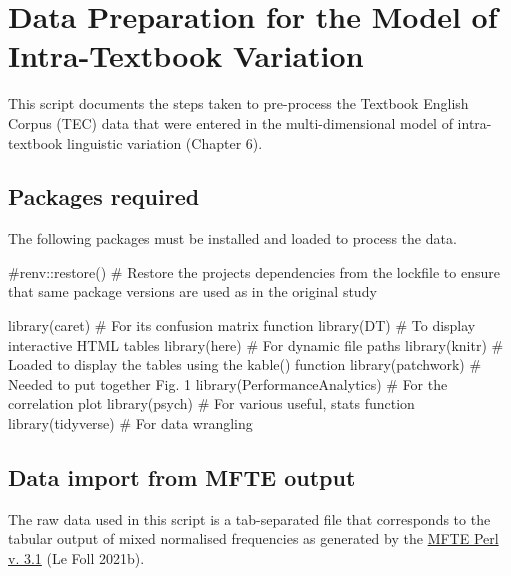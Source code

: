 \documentclass[
  letterpaper,
  DIV=11,
  numbers=noendperiod]{scrreprt}
\newenvironment{Shaded}{\begin{snugshade}}{\end{snugshade}}
\newcommand{\CommentTok}[1]{\textcolor[rgb]{0.37,0.37,0.37}{#1}}
\newcommand{\FunctionTok}[1]{\textcolor[rgb]{0.28,0.35,0.67}{#1}}
\newcommand{\NormalTok}[1]{\textcolor[rgb]{0.00,0.23,0.31}{#1}}
\begin{document}
\chapter{Data Preparation for the Model of Intra-Textbook
Variation}\label{data-preparation-for-the-model-of-intra-textbook-variation}

This script documents the steps taken to pre-process the Textbook
English Corpus (TEC) data that were entered in the multi-dimensional
model of intra-textbook linguistic variation (Chapter 6).

\section{Packages required}\label{packages-required}

The following packages must be installed and loaded to process the data.

\begin{Shaded}
\begin{Highlighting}[]
\CommentTok{\#renv::restore() \# Restore the project\textquotesingle{}s dependencies from the lockfile to ensure that same package versions are used as in the original study}

\FunctionTok{library}\NormalTok{(caret) }\CommentTok{\# For its confusion matrix function}
\FunctionTok{library}\NormalTok{(DT) }\CommentTok{\# To display interactive HTML tables}
\FunctionTok{library}\NormalTok{(here) }\CommentTok{\# For dynamic file paths}
\FunctionTok{library}\NormalTok{(knitr) }\CommentTok{\# Loaded to display the tables using the kable() function}
\FunctionTok{library}\NormalTok{(patchwork) }\CommentTok{\# Needed to put together Fig. 1}
\FunctionTok{library}\NormalTok{(PerformanceAnalytics) }\CommentTok{\# For the correlation plot}
\FunctionTok{library}\NormalTok{(psych) }\CommentTok{\# For various useful, stats function}
\FunctionTok{library}\NormalTok{(tidyverse) }\CommentTok{\# For data wrangling}
\end{Highlighting}
\end{Shaded}

\section{Data import from MFTE
output}\label{data-import-from-mfte-output}

The raw data used in this script is a tab-separated file that
corresponds to the tabular output of mixed normalised frequencies as
generated by the
\href{https://github.com/mshakirDr/MultiFeatureTaggerEnglish}{MFTE Perl
v. 3.1} (Le Foll 2021b).
\end{document}
